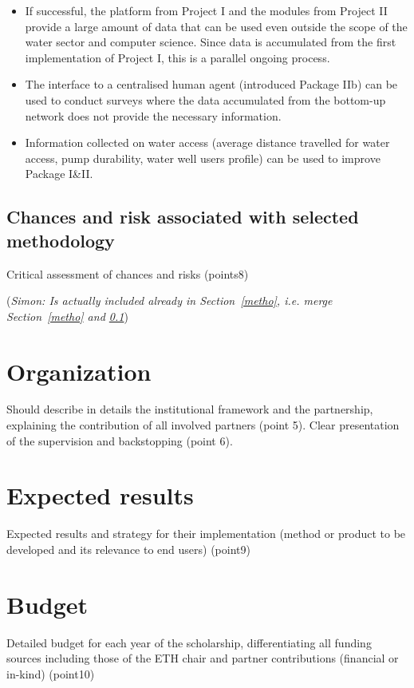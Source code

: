\documentclass[11pt]{article}
\newcommand{\simon}[1]{\vspace{1em}(\emph{Simon: #1})\vspace{1em}}
\begin{document}
\begin{itemize}
 \item If successful, the platform from Project I and the modules from Project II provide a large amount of data that can be used even outside the scope of the water sector and computer science. Since data is accumulated from the first implementation of Project I, this is a parallel ongoing process.
 \item The interface to a centralised human agent (introduced Package IIb) can be used to conduct surveys where the data accumulated from the bottom-up network does not provide the necessary information.
 
 \item Information collected on water access (average distance travelled for water access, pump durability, water well users profile) can be used to improve Package I\&II.
\end{itemize}



\subsection{Chances and risk associated with selected methodology}\label{risk}
Critical assessment of chances and risks (points8)

\simon{Is actually included already in Section~\ref{metho}, i.e. merge Section~\ref{metho} and \ref{risk}}

\section{Organization}\label{organization}
Should describe in details the institutional framework and the partnership, explaining the contribution of all involved partners (point 5). Clear presentation of the supervision and backstopping (point 6).
\section{Expected results}\label{expected}
Expected results and strategy for their implementation (method or product to be developed and its relevance to end users) (point9)
\section{Budget}
Detailed budget for each year of the scholarship, differentiating all funding sources including those of the ETH chair and partner contributions (financial or in-kind) (point10)




\end{document}
